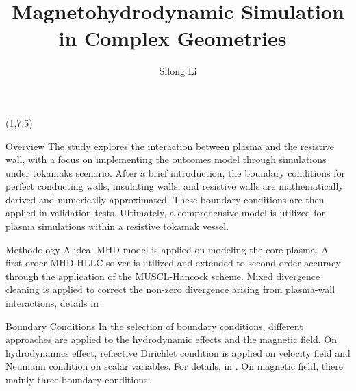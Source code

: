 \documentclass[final]{beamer}
\title{Magnetohydrodynamic Simulation in Complex Geometries }
\author{Silong Li}
\begin{document}
\begin{frame}{} 

\begin{textblock}{19.5}(1,7.5)
\begin{block}{Overview}
The study explores the interaction between plasma and the resistive wall, with a focus on implementing the outcomes model through simulations under tokamaks scenario. After a brief introduction, the boundary conditions for perfect conducting walls, insulating walls, and resistive walls are mathematically derived and numerically approximated. These boundary conditions are then applied in validation tests. Ultimately, a comprehensive model is utilized for plasma simulations within a resistive tokamak vessel.
\end{block}
\begin{block}{Methodology}
A ideal MHD model is applied on modeling the core plasma. 
A first-order MHD-HLLC solver is utilized and extended to second-order accuracy through the application of the MUSCL-Hancock scheme. Mixed divergence cleaning is applied to correct the non-zero divergence arising from plasma-wall interactions, details in \cite{vides2013divergence}. 

\end{block}
\begin{block}{Boundary Conditions}
In the selection of boundary conditions, different approaches are applied to the hydrodynamic effects and the magnetic field. On hydrodynamics effect, reflective Dirichlet condition is applied on velocity field and Neumann condition on scalar variables. For details, in \cite{sambasivan2009ghost}.
On magnetic field, there mainly three boundary conditions:
\vspace{0.5cm}


\end{block}
\end{textblock}
\end{frame}
\end{document}
